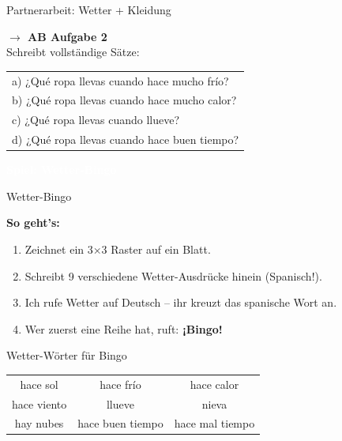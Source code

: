 \documentclass[aspectratio=169,11pt]{beamer}
\newcommand{\es}[1]{\textcolor{spanisch}{\textbf{#1}}}
\newcommand{\phase}[1]{\begin{center}\colorbox{spanisch}{\textcolor{white}{\large\bfseries #1}}\end{center}}
\begin{document}
\begin{frame}{Partnerarbeit: Wetter + Kleidung}
\begin{center}
{\Large\bfseries $\rightarrow$ AB Aufgabe 2}\\[0.8cm]
{\Large Schreibt vollständige Sätze:}\\[0.5cm]
\begin{tabular}{l}
a) ¿Qué ropa llevas cuando hace mucho frío? \\[0.5em]
b) ¿Qué ropa llevas cuando hace mucho calor? \\[0.5em]
c) ¿Qué ropa llevas cuando llueve? \\[0.5em]
d) ¿Qué ropa llevas cuando hace buen tiempo? \\
\end{tabular}
\end{center}
\end{frame}


\begin{frame}{}
\phase{Spiel: Wetter-Bingo}
\end{frame}

\begin{frame}{Wetter-Bingo}
\begin{center}
{\Large\bfseries So geht's:}\\[0.8cm]
\begin{enumerate}
\setlength\itemsep{0.5em}
\item Zeichnet ein 3×3 Raster auf ein Blatt.
\item Schreibt 9 verschiedene Wetter-Ausdrücke hinein (Spanisch!).
\item Ich rufe Wetter auf Deutsch – ihr kreuzt das spanische Wort an.
\item Wer zuerst eine Reihe hat, ruft: \es{¡Bingo!}
\end{enumerate}
\end{center}
\end{frame}

\begin{frame}{Wetter-Wörter für Bingo}
\begin{center}
\begin{tabular}{ccc}
hace sol & hace frío & hace calor \\[0.8em]
hace viento & llueve & nieva \\[0.8em]
hay nubes & hace buen tiempo & hace mal tiempo \\
\end{tabular}
\end{center}
\end{frame}
\end{document}
